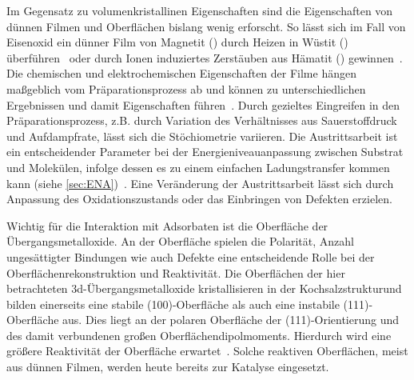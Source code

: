         Im Gegensatz zu volumenkristallinen Eigenschaften sind die Eigenschaften von dünnen Filmen und Oberflächen bislang wenig erforscht.
        So lässt sich im Fall von Eisenoxid ein dünner Film von Magnetit () durch Heizen in Wüstit () überführen~\cite{FeO_1} oder durch Ionen induziertes Zerstäuben aus Hämatit () gewinnen~\cite{FeO_36}.
        Die chemischen und elektrochemischen Eigenschaften der Filme hängen maßgeblich vom Präparationsprozess ab und können zu unterschiedlichen Ergebnissen und damit Eigenschaften führen~\cite{Uni-Tübingen}.
        Durch gezieltes Eingreifen in den Präparationsprozess, z.B. durch Variation des Verhältnisses aus Sauerstoffdruck und Aufdampfrate, lässt sich die Stöchiometrie variieren.
        Die Austrittsarbeit ist ein entscheidender Parameter bei der Energieniveauanpassung zwischen Substrat und Molekülen, infolge dessen es zu einem einfachen Ladungstransfer kommen kann (siehe \autoref{sec:ENA})~\cite{IF_3}.
        Eine Veränderung der Austrittsarbeit lässt sich durch Anpassung des Oxidationszustands oder das Einbringen von Defekten erzielen.

        Wichtig für die Interaktion mit Adsorbaten ist die Oberfläche der Übergangsmetalloxide.
        An der Oberfläche spielen die Polarität, Anzahl ungesättigter Bindungen wie auch Defekte eine entscheidende Rolle bei der Oberflächenrekonstruktion und Reaktivität.
        Die Oberflächen der hier betrachteten 3d-Übergangsmetalloxide kristallisieren in der Kochsalzstrukturund bilden einerseits eine stabile (100)-Oberfläche als auch eine instabile (111)-Oberfläche aus.
        Dies liegt an der polaren Oberfläche der (111)-Orientierung und des damit verbundenen großen Oberflächendipolmoments.
        Hierdurch wird eine größere Reaktivität der Oberfläche erwartet~\cite{cappus_hydroxyl_1993}.
        Solche reaktiven Oberflächen, meist aus dünnen Filmen, werden heute bereits zur Katalyse eingesetzt.
    
